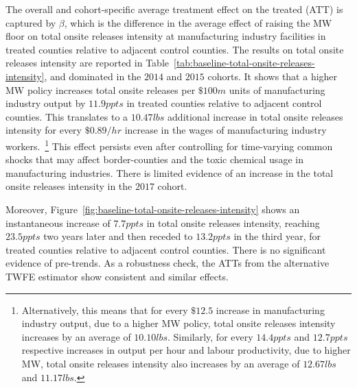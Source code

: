 \documentclass{C:/Users/david/OneDrive/Documents/ULMS/PhD/Thesis/chapter3/src/climate_change/latex/Economic_Journal/OUP-EJ}
\begin{document}
    The overall and cohort-specific average treatment effect on the treated (ATT) is captured by $\beta$, which is the difference in the average effect of raising the MW floor on total onsite releases intensity at manufacturing industry facilities in treated counties relative to adjacent control counties. The results on total onsite releases intensity are reported in Table~\ref{tab:baseline-total-onsite-releases-intensity}, and dominated in the $2014$ and $2015$ cohorts. It shows that a higher MW policy increases total onsite releases per $\$100m$ units of manufacturing industry output by $11.9ppts$ in treated counties relative to adjacent control counties. This translates to a $10.47lbs$ additional increase in total onsite releases intensity for every $\$0.89/hr$ increase in the wages of manufacturing industry workers.~\footnote{\tiny Alternatively, this means that for every $\$12.5$ increase in manufacturing industry output, due to a higher MW policy, total onsite releases intensity increases by an average of $10.10lbs$. Similarly, for every $14.4ppts$ and $12.7ppts$ respective increases in output per hour and labour productivity, due to higher MW, total onsite releases intensity also increases by an average of $12.67lbs$ and $11.17lbs$.} This effect persists even after controlling for time-varying common shocks that may affect border-counties and the toxic chemical usage in manufacturing industries. There is limited evidence of an increase in the total onsite releases intensity in the $2017$ cohort.
    

    Moreover, Figure~\ref{fig:baseline-total-onsite-releases-intensity} shows an instantaneous increase of $7.7ppts$ in total onsite releases intensity, reaching $23.5ppts$ two years later and then receded to $13.2ppts$ in the third year, for treated counties relative to adjacent control counties. There is no significant evidence of pre-trends. As a robustness check, the ATTs from the alternative TWFE estimator show consistent and similar effects.
\end{document}
